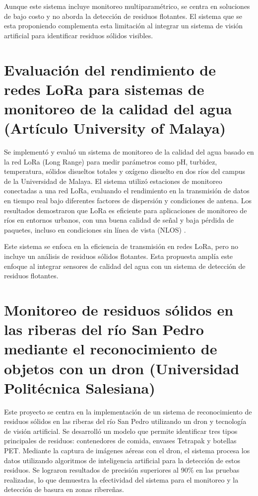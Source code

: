 Aunque este sistema incluye monitoreo multiparamétrico, se centra en soluciones de bajo costo y no aborda la detección de residuos flotantes. El sistema que se esta proponiendo complementa esta limitación al integrar un sistema de visión artificial para identificar residuos sólidos visibles.


\section{Evaluación del rendimiento de redes LoRa para sistemas de monitoreo de la calidad del agua (Artículo University of Malaya)}

Se implementó y evaluó un sistema de monitoreo de la calidad del agua basado en la red LoRa (Long Range) para medir parámetros como pH, turbidez, temperatura, sólidos disueltos totales y oxígeno disuelto en dos ríos del campus de la Universidad de Malaya. El sistema utilizó estaciones de monitoreo conectadas a una red LoRa, evaluando el rendimiento en la transmisión de datos en tiempo real bajo diferentes factores de dispersión y condiciones de antena. Los resultados demostraron que LoRa es eficiente para aplicaciones de monitoreo de ríos en entornos urbanos, con una buena calidad de señal y baja pérdida de paquetes, incluso en condiciones sin línea de vista (NLOS) \cite{syed2024}.

Este sistema se enfoca en la eficiencia de transmisión en redes LoRa, pero no incluye un análisis de residuos sólidos flotantes. Esta propuesta amplía este enfoque al integrar sensores de calidad del agua con un sistema de detección de residuos flotantes.

\newpage

\section{Monitoreo de residuos sólidos en las riberas del río San Pedro mediante el reconocimiento de objetos con un dron (Universidad Politécnica Salesiana)}

Este proyecto se centra en la implementación de un sistema de reconocimiento de residuos sólidos en las riberas del río San Pedro utilizando un dron y tecnología de visión artificial. Se desarrolló un modelo que permite identificar tres tipos principales de residuos: contenedores de comida, envases Tetrapak y botellas PET. Mediante la captura de imágenes aéreas con el dron, el sistema procesa los datos utilizando algoritmos de inteligencia artificial para la detección de estos residuos. Se lograron resultados de precisión superiores al 90\% en las pruebas realizadas, lo que demuestra la efectividad del sistema para el monitoreo y la detección de basura en zonas ribereñas\cite{ortega2024}.

